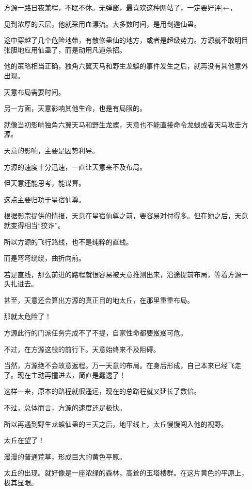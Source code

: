 
\begin{this_body}

方源一路日夜兼程，不眠不休。无弹窗，最喜欢这种网站了，一定要好评]←，

见到浓厚的云层，他就采用血漂流。大多数时间，是用剑遁仙蛊。

途中穿越了几个危险地带，有散修蛊仙的地方，或者是超级势力。方源就不敢明目张胆地应用仙蛊了，而是动用凡道杀招。

他的策略相当正确，独角六翼天马和野生龙蜈的事件发生之后，就再没有其他意外出现。

天意布局需要时间。

另一方面，天意影响其他生命，也是有局限的。

就像当初影响独角六翼天马和野生龙蜈，天意也不能直接命令龙蜈或者天马攻击方源。

天意的影响，主要是因势利导。

方源的速度十分迅速，一直让天意来不及布局。

但天意还能思考，能谋算。

这点主要归功于星宿仙尊。

根据影宗提供的情报，天意在星宿仙尊之前，要容易对付得多。但在她之后，天意就变得相当“狡诈”。

所以方源的飞行路线，也不是纯粹的直线。

而是弯弯绕绕，曲折向前。

若是直线，那么前进的路程就很容易被天意推测出来，沿途提前布局，等着方源一头扎进去。

甚至，天意还会算出方源的真正目的地太丘，在那里重重布局。

那就太危险了！

方源此行的门派任务完成不了不提，自家性命都要岌岌可危。

不过，在方源这般的前行下。天意始终来不及阻碍。

当然，方源绝不会故意返程。万一天意的布局。在身后形成，自己本来已经飞走了。现在主动再撞进去，简直是蠢透了！

这样一来，原本的路程就很遥远，现在的总路程就又延长了数倍。

不过，总体而言，方源的速度还是极快。

所以再遇到野生龙蜈仙蛊的三天之后，地平线上，太丘慢慢闯入他的视野。

太丘在望了！

漫漫的普通荒草，形成巨大的黄色平原。

太丘的出现。就好像是一座浓绿的森林，高耸的玉塔楼群。在这片黄色的平原上，极其显眼。


\end{this_body}
